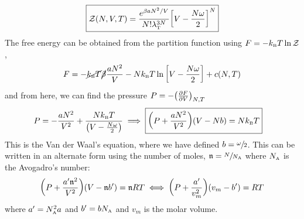 \begin{equation}\label{eqn:partition}
    \boxed{\mathcal Z(N,V,T) = \frac{e^{\beta aN^2/V}}{N! \lambda_{\text{\tiny T}}^{3N}}\qty[V-\frac{N\omega}{2}]^N }
\end{equation}
The free energy can be obtained from the partition function using $F = -k_{\text{\tiny B}} T \ln \mathcal Z$,
$$F = -\cancel{k_{\text{\tiny B}} T} \cancel{\beta} \frac{a N^2}{V}-Nk_{\text{\tiny B}} T \ln\qty[V-\frac{N\omega}{2}]+c(N,T)$$
and from here, we can find the pressure $P = - \qty(\pdv{F}{V})_{N,T}$ 
\begin{align}
    \label{eqn:vander}
    P &=-\frac{aN^2}{V^2} +\frac{Nk_{\text{\tiny B}} T}{\qty(V-\frac{N\omega}{2})} \implies \boxed{\qty(P+\frac{aN^2}{V^2})\qty(V-Nb) = Nk_{\text{\tiny B}} T}
\end{align}
This is the Van der Waal's equation, where we have defined $b = \sfrac{\omega}{2}$. This can be written in an alternate form using the number of moles, $\mathfrak{n} = \sfrac{N}{N_{\text{\tiny A}}}$ where $N_{\text{\tiny A}}$ is the Avogadro's number:
$$\qty(P+\frac{a'\mathfrak{n}^2}{V^2})\qty(V-\mathfrak{n}b') = \mathfrak{n}RT\iff \qty(P+\frac{a'}{v_m^2})\qty(v_m-b') = RT$$
where $a' = N_{\text{\tiny A}}^2 a$ and $b' = b N_{\text{\tiny A}}$ and $v_m$ is the molar volume. 

